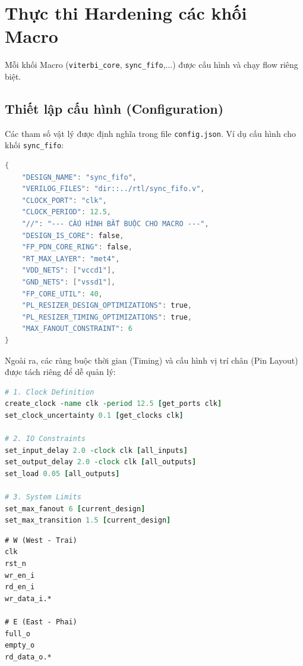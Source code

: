 \documentclass[12pt,a4paper]{report}
\begin{document}
\section{Thực thi Hardening các khối Macro}
Mỗi khối Macro (\texttt{viterbi\_core}, \texttt{sync\_fifo},...) được cấu hình và chạy flow riêng biệt.

\subsection{Thiết lập cấu hình (Configuration)}
Các tham số vật lý được định nghĩa trong file \texttt{config.json}. Ví dụ cấu hình cho khối \texttt{sync\_fifo}:

\begin{lstlisting}[language=C, caption=Cấu hình OpenLane cho Macro (Ví dụ: sync\_fifo)]
{
    "DESIGN_NAME": "sync_fifo",
    "VERILOG_FILES": "dir::../rtl/sync_fifo.v",
    "CLOCK_PORT": "clk",
    "CLOCK_PERIOD": 12.5,
    "//": "--- CẤU HÌNH BẮT BUỘC CHO MACRO ---",
    "DESIGN_IS_CORE": false,
    "FP_PDN_CORE_RING": false,
    "RT_MAX_LAYER": "met4",
    "VDD_NETS": ["vccd1"],
    "GND_NETS": ["vssd1"],
    "FP_CORE_UTIL": 40,
    "PL_RESIZER_DESIGN_OPTIMIZATIONS": true,
    "PL_RESIZER_TIMING_OPTIMIZATIONS": true,
    "MAX_FANOUT_CONSTRAINT": 6
}
\end{lstlisting}

Ngoài ra, các ràng buộc thời gian (Timing) và cấu hình vị trí chân (Pin Layout) được tách riêng để dễ quản lý:

\begin{lstlisting}[language=Tcl, caption=Ràng buộc thời gian (constraints.sdc)]
# 1. Clock Definition
create_clock -name clk -period 12.5 [get_ports clk]
set_clock_uncertainty 0.1 [get_clocks clk]

# 2. IO Constraints
set_input_delay 2.0 -clock clk [all_inputs]
set_output_delay 2.0 -clock clk [all_outputs]
set_load 0.05 [all_outputs]

# 3. System Limits
set_max_fanout 6 [current_design]
set_max_transition 1.5 [current_design]
\end{lstlisting}

\begin{lstlisting}[caption=Cấu hình vị trí chân (pin\_order.cfg)]
# W (West - Trai)
clk
rst_n
wr_en_i
rd_en_i
wr_data_i.*

# E (East - Phai)
full_o
empty_o
rd_data_o.*
\end{lstlisting}
\end{document}
